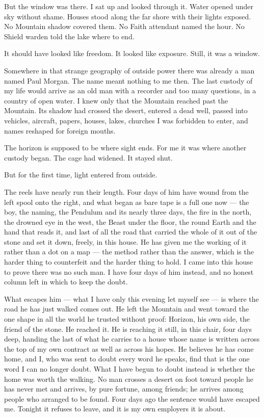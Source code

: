 But the window was there. I sat up and looked through it. Water opened under sky without shame. Houses stood along the far shore with their lights exposed. No Mountain shadow covered them. No Faith attendant named the hour. No Shield warden told the lake where to end.\par

It should have looked like freedom. It looked like exposure. Still, it was a window.\par

Somewhere in that strange geography of outside power there was already a man named Paul Morgan. The name meant nothing to me then. The last custody of my life would arrive as an old man with a recorder and too many questions, in a country of open water. I knew only that the Mountain reached past the Mountain. Its shadow had crossed the desert, entered a dead well, passed into vehicles, aircraft, papers, houses, lakes, churches I was forbidden to enter, and names reshaped for foreign mouths.\par

The horizon is supposed to be where sight ends. For me it was where another custody began. The cage had widened. It stayed shut.\par

But for the first time, light entered from outside.\par

\ornament

The reels have nearly run their length. Four days of him have wound from the left spool onto the right, and what began as bare tape is a full one now --- the boy, the naming, the Pendulum and its nearly three days, the fire in the north, the drowned eye in the west, the Beast under the floor, the round Earth and the hand that reads it, and last of all the road that carried the whole of it out of the stone and set it down, freely, in this house. He has given me the working of it rather than a dot on a map --- the method rather than the answer, which is the harder thing to counterfeit and the harder thing to hold. I came into this house to prove there was no such man. I have four days of him instead, and no honest column left in which to keep the doubt.\par

What escapes him --- what I have only this evening let myself see --- is where the road he has just walked comes out. He left the Mountain and went toward the one shape in all the world he trusted without proof: Horizon, his own side, the friend of the stone. He reached it. He is reaching it still, in this chair, four days deep, handing the last of what he carries to a house whose name is written across the top of my own contract as well as across his hopes. He believes he has come home, and I, who was sent to doubt every word he speaks, find that is the one word I can no longer doubt. What I have begun to doubt instead is whether the home was worth the walking. No man crosses a desert on foot toward people he has never met and arrives, by pure fortune, among friends; he arrives among people who arranged to be found. Four days ago the sentence would have escaped me. Tonight it refuses to leave, and it is my own employers it is about.\par

